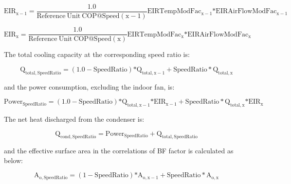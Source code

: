 \begin{equation}
{\mathrm{EI}}{{\mathrm{R}}_{{\mathrm{x}} - 1}} = \frac{{1.0}}{{{\mathrm{Reference~Unit~COP}}@{\mathrm{Speed}}({\mathrm{x}} - 1)}}{\mathrm{EIRTempModFa}}{{\mathrm{c}}_{{\mathrm{x}} - 1}}{\mathrm{*EIRAirFlowModFa}}{{\mathrm{c}}_{{\mathrm{x}} - 1}}
\end{equation}

\begin{equation}
{\mathrm{EI}}{{\mathrm{R}}_{\mathrm{x}}} = \frac{{1.0}}{{{\mathrm{Reference~Unit~COP}}@{\mathrm{Speed}}\left( {\mathrm{x}} \right)}}{\mathrm{EIRTempModFa}}{{\mathrm{c}}_{\mathrm{x}}}{\mathrm{*EIRAirFlowModFa}}{{\mathrm{c}}_{\mathrm{x}}}
\end{equation}

The total cooling capacity at the corresponding speed ratio is:

\begin{equation}
{{\mathrm{Q}}_{{\mathrm{total}},{\mathrm{SpeedRatio}}}} = \left( {1.0 - {\mathrm{SpeedRatio}}} \right){\mathrm{*}}{{\mathrm{Q}}_{{\mathrm{total}},{\mathrm{x}} - 1}} + {\mathrm{SpeedRatio*}}{{\mathrm{Q}}_{{\mathrm{total}},{\mathrm{x}}}}
\end{equation}

and the power consumption, excluding the indoor fan, is:

\begin{equation}
{\mathrm{Powe}}{{\mathrm{r}}_{{\mathrm{SpeedRatio}}}} = \left( {1.0 - {\mathrm{SpeedRatio}}} \right){\mathrm{*}}{{\mathrm{Q}}_{{\mathrm{total}},{\mathrm{x}} - 1}}{\mathrm{*EI}}{{\mathrm{R}}_{{\mathrm{x}} - 1}} + {\mathrm{SpeedRatio*}}{{\mathrm{Q}}_{{\mathrm{total}},{\mathrm{x}}}}{\mathrm{*EI}}{{\mathrm{R}}_{\mathrm{x}}}
\end{equation}

The net heat discharged from the condenser is:

\begin{equation}
{{\mathrm{Q}}_{{\mathrm{cond}},{\mathrm{SpeedRatio}}}} = {\mathrm{Powe}}{{\mathrm{r}}_{{\mathrm{SpeedRatio}}}} + {{\mathrm{Q}}_{{\mathrm{total}},{\mathrm{SpeedRatio}}}}
\end{equation}

and the effective surface area in the correlations of BF factor is calculated as below:

\begin{equation}
{{\mathrm{A}}_{{\mathrm{o}},{\mathrm{SpeedRatio}}}} = \left( {1 - {\mathrm{SpeedRatio}}} \right){\mathrm{*}}{{\mathrm{A}}_{{\mathrm{o}},{\mathrm{x}} - 1}} + {\mathrm{SpeedRatio*}}{{\mathrm{A}}_{{\mathrm{o}},{\mathrm{x}}}}
\end{equation}

